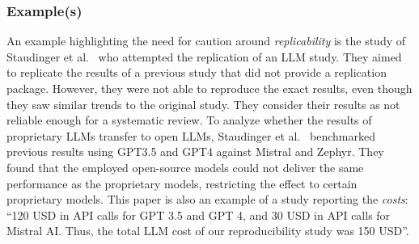 \subsubsection{Example(s)}

An example highlighting the need for caution around \emph{replicability} is the study of Staudinger et al.~\cite{DBLP:conf/sigir-ap/StaudingerKPLH24} who attempted the replication of an LLM study. They aimed to replicate the results of a previous study that did not provide a replication package. However, they were not able to reproduce the exact results, even though they saw similar trends to the original study. They consider their results as not reliable enough for a systematic review.
To analyze whether the results of proprietary LLMs transfer to open LLMs, Staudinger et al.~\cite{DBLP:conf/sigir-ap/StaudingerKPLH24} benchmarked previous results using GPT3.5 and GPT4 against Mistral and Zephyr. They found that the employed open-source models could not deliver the same performance as the proprietary models, restricting the effect to certain proprietary models.
This paper is also an example of a study reporting the \emph{costs}: \enquote{120 USD in API calls for GPT 3.5 and GPT 4, and 30 USD in API calls for Mistral AI. Thus, the total LLM cost of our reproducibility study was 150 USD}.

